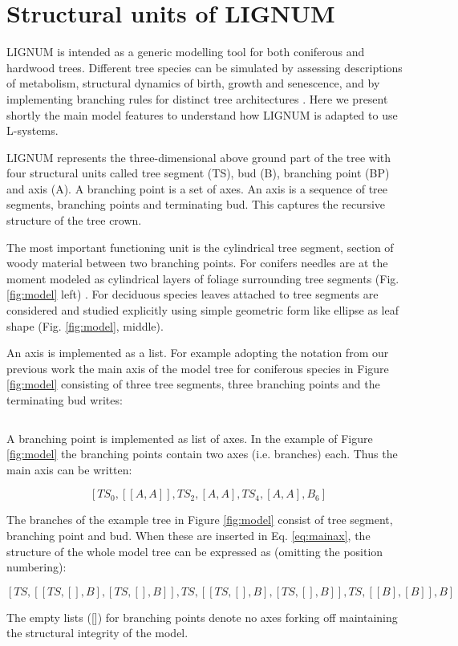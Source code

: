\section{Structural units of LIGNUM}
LIGNUM is intended as a generic modelling tool for both coniferous and
hardwood trees.  Different tree  species can be simulated by assessing
descriptions of  metabolism, structural dynamics of  birth, growth and
senescence,  and by  implementing  branching rules  for distinct  tree
architectures  \citep{perttunen:96,  perttunen:01}.   Here we  present
shortly the main model features to understand how LIGNUM is adapted to
use L-systems.

LIGNUM represents the three-dimensional  above ground part of the tree
with  four  structural  units  called  tree  segment  (TS),  bud  (B),
branching point  (BP) and  axis (A).   A branching point  is a  set of
axes. An  axis is  a sequence of  tree segments, branching  points and
terminating bud.   This captures the  recursive structure of  the tree
crown.

The most  important functioning unit is the  cylindrical tree segment,
section of woody material  between two branching points.  For conifers
needles are  at the  moment modeled as  cylindrical layers  of foliage
surrounding  tree   segments  (Fig.   \ref{fig:model}   left)  .   For
deciduous species leaves attached  to tree segments are considered and
studied explicitly  using simple geometric  form like ellipse  as leaf
shape (Fig. \ref{fig:model}, middle).

An axis  is implemented as a  list. For example  adopting the notation
from our previous work \citep{perttunen:96} the main axis of the model
tree for  coniferous species  in Figure \ref{fig:model}  consisting of
three tree  segments, three branching  points and the  terminating bud
writes:

\begin{equation}
[TS_0,BP_1,TS_2,BP_3,TS_4,BP_5,B_6]
\end{equation}

A branching  point is implemented as  list of axes. In  the example of
Figure   \ref{fig:model}  the  branching   points  contain   two  axes
(i.e. branches) each. Thus the main axis can be written:

\begin{equation}\label{eq:mainax}
[TS_0,[[A,A]],TS_2,[A,A],TS_4,[A,A],B_6]
\end{equation}

The branches of the example  tree in Figure \ref{fig:model} consist of
tree  segment, branching  point and  bud. When  these are  inserted in
Eq. \ref{eq:mainax},  the structure  of  the whole  model  tree can  be
expressed as (omitting the position numbering):

\begin{equation}\label{eq:tree}
[TS,[[TS,[],B],[TS,[],B]],TS,[[TS,[],B],[TS,[],B]],TS,[[B],[B]],B]
\end{equation}

The empty lists  ([]) for branching points denote  no axes forking off
maintaining the structural integrity of the model.

